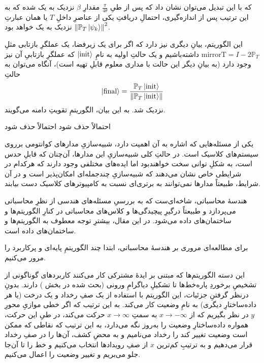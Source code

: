 که با این تبدیل می‌توان نشان داد که پس از طیِ
$\frac{\pi}{4\theta}$
مقدارِ $\beta$ نزدیک به یک شده که به این ترتیب پس از اندازه‌گیری، احتمالِ دریافتِ یکی از عناصرِ داخلِ $T$ یا همان عبارتِ 
$\norm{\mathbb{P}_T \ket{\psi_k}}^2$
نزدیک به یک خواهد بود.

این الگوریتم، بیانِ دیگری نیز دارد که اگر برای یک زیرفضا، یک عملگرِ بازتابی مثلِ
$\text{mirrorT} = I - 2\mathbb{P}_T$
داشته‌باشیم و یک حالتِ اولیه به نامِ 
$\ket{\text{init}}$
 که عملگرِ بازتابیِ آن نیز وجود دارد (به بیانِ دیگر این حالت با مداری معلوم قابلِ تهیه است)، آنگاه می‌توان به حالتِ
\begin{equation}
    \ket{\text{final}} = \frac{\mathbb{P}_T \ket{\text{init}}}{\norm{\mathbb{P}_T \ket{\text{init}}}}
\end{equation}
نزدیک شد.
به این بیان، الگوریتمِ تقویتِ دامنه می‌گویند. 

احتمالاً حذف شود
احتمالاً حذف شود

یکی از مسئله‌هایی که اشاره به آن اهمیت دارد، شبیه‌سازیِ مدارهای کوانتومی برروی سیستم‌های کلاسیک است. در حالتِ کلی شبیه‌سازیِ این مدارها، آن‌چنان که قابلِ حدس است، به شکلِ توانی سخت خواهندبود اما ایده‌های مختلفی وجود دارند که هرکدام در شرایطی خاص نشان می‌دهند که شبیه‌سازیِ چندجمله‌ای امکان‌پذیر است و در آن شرایط، طبیعتاً مدارها نمی‌توانند به برتری‌ای نسبت به کامپیوترهای کلاسیک دست بیابند.


هندسهٔ محاسباتی، شاخه‌ای‌ست که به بررسیِ مسئله‌های هندسی از نظرِ محاسباتی می‌پردازد و طبیعتاً درگیرِ پیچیدگی‌ها و کلاس‌های محاسباتی در کنارِ الگوریتم‌ها و ساختمان‌های داده می‌شود. در این مقال، بیشترِ توجه معطوف به الگوریتم‌ها و ساختمان‌های داده است.

برای مطالعه‌ای مروری بر هندسهٔ محاسباتی، ابتدا چند الگوریتمِ پایه‌ای و پرکاربرد را مرور می‌کنیم.

این دسته الگوریتم‌ها که مبتنی بر ایدهٔ مشترکی کار می‌کنند کاربردهای گوناگونی از تشخیصِ برخوردِ پاره‌خط‌ها تا تشکیلِ 
دیاگرامِ ورونی (بحث شده در بخش )
دارند. بدونِ درنظر گرفتنِ جزئیات، این الگوریتم با استفاده از یک صفِ رخداد و یک درخت (یا هر داده‌ساختارِ دیگری) به نامِ وضعیت کار می‌کند. به این ترتیب که اگر خطی موازیِ محورِ $y$ در نظر بگیریم که از $x\to-\infty$ به سمتِ $x\to\infty$ حرکت می‌کند، در طیِ این حرکت، همواره داده‌ساختارِ وضعیت را به‌روز نگه می‌دارد، به این ترتیب که نقاطی که ممکن است وضعیت تغییر کند را رخداد می‌نامیم و به محضِ کشف، آن‌ها را در صفِ رخداد قرار می‌دهیم و به ترتیبِ کم‌ترین $x$ از صفِ رویدادها انتخاب می‌کنیم و خط را تا آن‌جا جلو می‌بریم و تغییر وضعیت را اعمال می‌کنیم.

